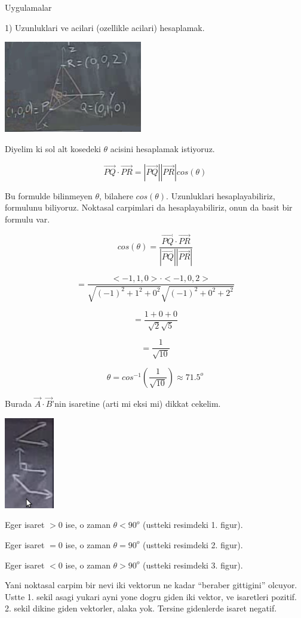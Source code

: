 \documentclass[12pt,fleqn]{article}\usepackage{../common}
\begin{document}
Uygulamalar

1) Uzunluklari ve acilari (ozellikle acilari) hesaplamak.

\includegraphics[height=4cm]{1_12.png}

Diyelim ki sol alt kosedeki $\theta$ acisini hesaplamak istiyoruz. 

\[ \vec{PQ} \cdot \vec{PR} = |\vec{PQ}||\vec{PR}|cos(\theta)  \]

Bu formulde bilinmeyen $\theta$, bilahere $cos(\theta)$. Uzunluklari
hesaplayabiliriz, formulunu biliyoruz. Noktasal carpimlari da
hesaplayabiliriz, onun da basit bir formulu var. 

\[ cos(\theta) = \frac{\vec{PQ} \cdot \vec{PR}}{|\vec{PQ}||\vec{PR}|}\]

\[ = \frac{<-1,1,0>\cdot<-1,0,2>}
{  \sqrt{(-1)^2+1^2+0^2 }\sqrt{(-1)^2+0^2+2^2 }   } 
\]

\[ = \frac{1+0+0}{\sqrt{2}\sqrt{5}}  \]

\[ = \frac{1}{\sqrt{10}} \]

\[ \theta = cos^{-1}(\frac{1}{\sqrt{10}}) \approx 71.5^o \]

Burada $\vec{A}\cdot\vec{B}$'nin isaretine (arti mi eksi mi) dikkat
cekelim. 

\includegraphics[height=4cm]{1_13.png}

Eger isaret $>0$ ise, o zaman $\theta < 90^o$ (ustteki resimdeki
1. figur). 

Eger isaret $=0$ ise, o zaman $\theta = 90^o$ (ustteki resimdeki
2. figur). 

Eger isaret $<0$ ise, o zaman $\theta > 90^o$ (ustteki resimdeki
3. figur). 

Yani noktasal carpim bir nevi iki vektorun ne kadar ``beraber gittigini''
olcuyor. Ustte 1. sekil asagi yukari ayni yone dogru giden iki vektor, ve
isaretleri pozitif. 2. sekil dikine giden vektorler, alaka yok. Tersine
gidenlerde isaret negatif. 
\end{document}
